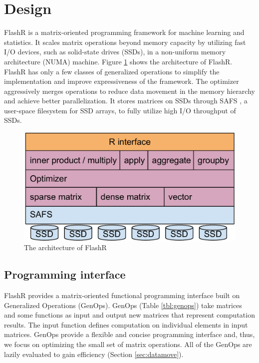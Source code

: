 \section{Design}

FlashR is a matrix-oriented programming framework for machine learning and
statistics. It scales matrix operations beyond memory capacity by utilizing
fast I/O devices, such as solid-state drives (SSDs), in a non-uniform memory
architecture (NUMA) machine. Figure \ref{fig:arch} shows the architecture of
FlashR. FlashR has only a few classes of generalized operations to simplify
the implementation and improve expressiveness of the framework. 
The optimizer aggressively merges operations to
reduce data movement in the memory hierarchy and achieve better parallelization.
It stores matrices on SSDs through SAFS \cite{safs},
a user-space filesystem for SSD arrays, to fully utilize high I/O
throughput of SSDs.

\begin{figure}
\centering
\includegraphics[scale=0.3]{FlashMatrix_figs/architecture.pdf}
\caption{The architecture of FlashR}
\label{fig:arch}
\end{figure}

\subsection{Programming interface}

FlashR provides a matrix-oriented functional programming interface built
on Generalized Operations (GenOps).  GenOps (Table \ref{tbl:genops}) take matrices and
some functions as input and output new matrices that represent computation results.
The input function defines computation on individual elements in input matrices.
GenOps provide a flexible and concise programming interface and, thus,
we focus on optimizing the small set of matrix operations. All of
the GenOps are lazily evaluated to gain efficiency (Section
\ref{sec:datamove}).

